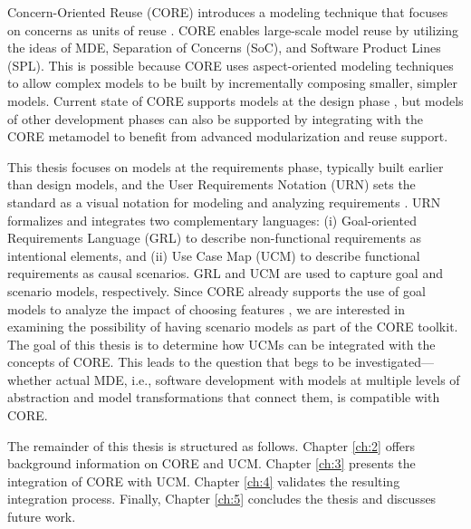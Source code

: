 Concern-Oriented Reuse (CORE) introduces a modeling technique that focuses on concerns as units of reuse \cite{alam2013concern}. CORE enables large-scale model reuse by utilizing the ideas of MDE, Separation of Concerns (SoC), and Software Product Lines (SPL). This is possible because CORE uses aspect-oriented modeling techniques to allow complex models to be built by incrementally composing smaller, simpler models. Current state of CORE supports models at the design phase \cite{kienzle2010aspect}, but models of other development phases can also be supported by integrating with the CORE metamodel to benefit from advanced modularization and reuse support.

This thesis focuses on models at the requirements phase, typically built earlier than design models, and the User Requirements Notation (URN) sets the standard as a visual notation for modeling and analyzing requirements \cite{amyot2002urn}. URN formalizes and integrates two complementary languages: (i) Goal-oriented Requirements Language (GRL) to describe non-functional requirements as intentional elements, and (ii) Use Case Map (UCM) to describe functional requirements as causal scenarios. GRL and UCM are used to capture goal and scenario models, respectively. Since CORE already supports the use of goal models to analyze the impact of choosing features \cite{alam2013concern}, we are interested in examining the possibility of having scenario models as part of the CORE toolkit. The goal of this thesis is to determine how UCMs can be integrated with the concepts of CORE. This leads to the question that begs to be investigated---whether actual MDE, i.e., software development with models at multiple levels of abstraction and model transformations that connect them, is compatible with CORE.

The remainder of this thesis is structured as follows. Chapter \ref{ch:2} offers background information on CORE and UCM. Chapter \ref{ch:3} presents the integration of CORE with UCM. Chapter \ref{ch:4} validates the resulting integration process. Finally, Chapter \ref{ch:5} concludes the thesis and discusses future work.
